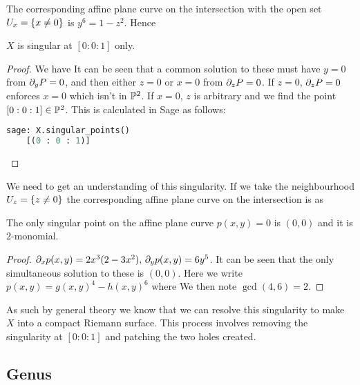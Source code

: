 \documentclass{article}
\begin{document}
The corresponding affine plane curve on the intersection with the open set $U_x = \left\{ x \neq 0 \right\}$ is $y^6 = 1-z^2$. Hence 
\begin{prop}
	$X$ is singular at $[0:0:1]$ only. 
\end{prop}
\begin{proof}
	We have 
	It can be seen that a common solution to these must have $y=0$ from $\partial_y P=0$, and then either $z=0$  or $x=0$ from $\partial_zP=0$. If $z=0$, $\partial_zP=0$ enforces $x=0$ which isn't in $\mathbb{P}^2$. If $x=0$, $z$ is arbitrary and we find the point $[0:0:1] \in \mathbb{P}^2$. This is calculated in Sage as follows:
	\begin{lstlisting}[language=Python,frame=single]
	sage: X.singular_points()
	[(0 : 0 : 1)]
	\end{lstlisting}
\end{proof}
We need to get an understanding of this singularity. If we take the neighbourhood $U_z = \left\{ z \neq 0 \right\}$ the corresponding affine plane curve on the intersection is 
as 
\begin{prop}
	The only singular point on the affine plane curve $p(x,y)=0$ is $(0,0)$ and it is $2$-monomial. 
\end{prop}
\begin{proof}
	$\partial_x p(x,y) = 2x^3(2-3x^2), \, \partial_y p(x,y) = 6y^5$. It can be seen that the only simultaneous solution to these is  $(0,0)$. Here we write $p(x,y)=g(x,y)^4 - h(x,y)^6$ where
	We then note $\gcd(4,6) = 2$. 
\end{proof}
As such by general theory we know that we can resolve this singularity to make $X$ into a compact Riemann surface. This process involves removing the singularity at $[0:0:1]$ and patching the two holes created. 

\subsection{Genus}
\end{document}

